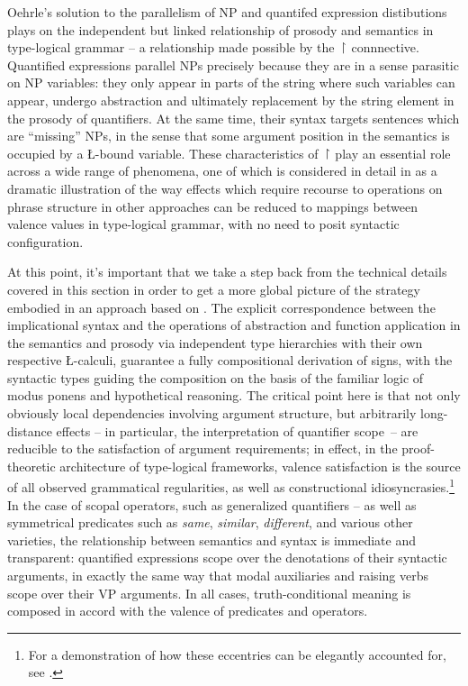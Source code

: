\documentclass[output=paper,colorlinks,citecolor=brown]{langscibook}
\begin{document}
Oehrle's solution to the parallelism of NP and quantifed expression
distibutions plays on the independent but linked relationship of
prosody and semantics in type-logical grammar -- a relationship made
possible by the \ensuremath{\vs} connnective. Quantified expressions parallel NPs
precisely because they are in a sense parasitic on NP variables: they
only appear in parts of the string where such variables can appear,
undergo abstraction and ultimately replacement by the string element
in the prosody of quantifiers. At the same time, their syntax targets
sentences which are ``missing'' NPs, in the sense that some argument
position in the semantics is occupied by a \L-bound variable. These
characteristics of \ensuremath{\vs} play an essential role across a wide range of
phenomena, one of which is considered in detail in  as
a dramatic illustration of the way effects which require recourse to
operations on phrase structure in other approaches can be reduced to
mappings between valence values in type-logical grammar, with no need
to posit syntactic configuration.



At this point, it's important that we take a step back from the
technical details covered in this section in order to get a more
global picture of the strategy embodied in an approach based on
. The explicit correspondence between the implicational syntax
and the operations of abstraction and function application in the
semantics and prosody via independent type hierarchies with their own
respective \L-calculi, guarantee a fully compositional derivation of
signs, with the syntactic types guiding the composition on the basis
of the familiar logic of modus ponens and hypothetical reasoning. The
critical point here is that not only obviously local dependencies
involving argument structure, but arbitrarily long-distance
effects -- in particular, the interpretation of quantifier scope~-- are
reducible to the satisfaction of argument requirements; in effect, in
the proof-theoretic architecture of type-logical frameworks, valence
satisfaction is the source of all observed grammatical regularities,
as well as constructional idiosyncrasies.\footnote{For
a demonstration of how these eccentries can be elegantly accounted
for, see \citet{kubota-levine2022a}.} In the case of scopal operators, such
as generalized quantifiers -- as well as symmetrical predicates such as
\textit{same}, \textit{similar}, \textit{different}, and various other varieties, the
relationship between semantics and syntax is immediate and
transparent: quantified expressions scope over the denotations of
their syntactic arguments, in exactly the same way that modal
auxiliaries and raising verbs scope over their VP arguments. In all
cases, truth-conditional meaning is composed in accord with the
valence of predicates and operators.
\end{document}
